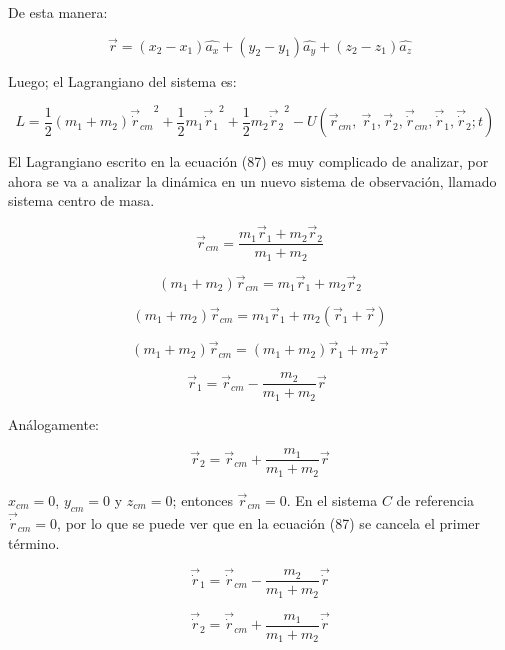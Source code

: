 \documentclass[]{article}
\begin{document}
De esta manera:

\[\overrightarrow{r} = \left( x_{2} - x_{1} \right)\widehat{a_{x}} + (y_{2} - y_{1})\widehat{a_{y}} + (z_{2} - z_{1})\widehat{a_{z}}\]

Luego; el Lagrangiano del sistema es:

\[L = \frac{1}{2}\left( m_{1} + m_{2} \right){{\overrightarrow{\dot{r}}}_{cm}}^{2} + \frac{1}{2}m_{1}{{\overrightarrow{\dot{r}}}_{1}}^{2} + \frac{1}{2}m_{2}{{\overrightarrow{\dot{r}}}_{2}}^{2} - U\left( {\overrightarrow{r}}_{cm},\ {\overrightarrow{r}}_{1},{\overrightarrow{r}}_{2},{\overrightarrow{\dot{r}}}_{cm},{\overrightarrow{\dot{r}}}_{1},{\overrightarrow{\dot{r}}}_{2};t \right)\ \ \ \]

El Lagrangiano escrito en la ecuación (87) es muy complicado de
analizar, por ahora se va a analizar la dinámica en un nuevo sistema de
observación, llamado sistema centro de masa.

\[{\overrightarrow{r}}_{cm} = \frac{m_{1}{\overrightarrow{r}}_{1} + m_{2}{\overrightarrow{r}}_{2}}{m_{1} + m_{2}}\]

\[\left( m_{1} + m_{2} \right){\overrightarrow{r}}_{cm} = m_{1}{\overrightarrow{r}}_{1} + m_{2}{\overrightarrow{r}}_{2}\]

\[\left( m_{1} + m_{2} \right){\overrightarrow{r}}_{cm} = m_{1}{\overrightarrow{r}}_{1} + m_{2}\left( {\overrightarrow{r}}_{1} + \overrightarrow{r} \right)\]

\[\left( m_{1} + m_{2} \right){\overrightarrow{r}}_{cm} = \left( m_{1} + m_{2} \right){\overrightarrow{r}}_{1} + m_{2}\overrightarrow{r}\]

\[{\overrightarrow{r}}_{1} = {\overrightarrow{r}}_{cm} - \frac{m_{2}}{m_{1} + m_{2}}\overrightarrow{r}\ \ \]

Análogamente:

\[{\overrightarrow{r}}_{2} = {\overrightarrow{r}}_{cm} + \frac{m_{1}}{m_{1} + m_{2}}\overrightarrow{r}\]

\(x_{cm} = 0\), \(y_{cm} = 0\) y \(z_{cm} = 0\); entonces
\({\overrightarrow{r}}_{cm} = 0\). En el sistema \(C\) de referencia
\({\overrightarrow{\dot{r}}}_{cm} = 0\), por lo que se puede ver que en
la ecuación (87) se cancela el primer término.

\[{\overrightarrow{\dot{r}}}_{1} = {\overrightarrow{\dot{r}}}_{cm} - \frac{m_{2}}{m_{1} + m_{2}}\overrightarrow{\dot{r}}\]

\[{\overrightarrow{\dot{r}}}_{2} = {\overrightarrow{\dot{r}}}_{cm} + \frac{m_{1}}{m_{1} + m_{2}}\overrightarrow{\dot{r}}\]
\end{document}
